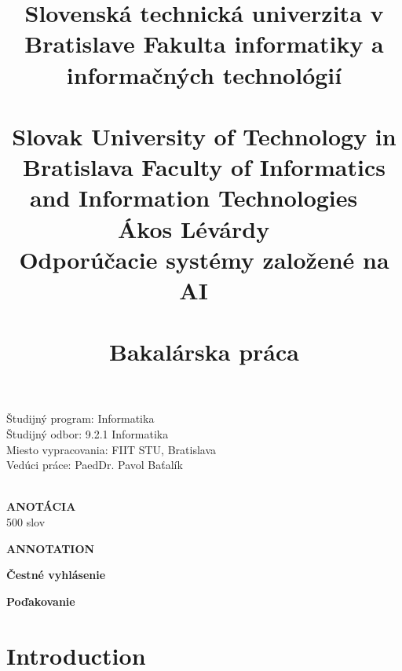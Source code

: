 \documentclass[10pt,oneside,english,a4paper]{article}
\title{\Large \textbf{
Slovenská technická univerzita v Bratislave
Fakulta informatiky a informačných technológií\\
\ \\
Slovak University of Technology in Bratislava
Faculty of Informatics and Information Technologies}
\ \\
\vspace{4\baselineskip}
\Large{ Ákos Lévárdy }
\ \\
\LARGE{ Odporúčacie systémy založené na AI }
\ \\
\ \\
\large{ Bakalárska práca }
}
\begin{document}
\maketitle


\vspace{7\baselineskip} %
\hspace{-2cm} %
\parbox{0.8\textwidth}{
\Large
Študijný program: Informatika\\
Študijný odbor: 9.2.1 Informatika\\
Miesto vypracovania: FIIT STU, Bratislava\\
Vedúci práce: PaedDr. Pavol Baťalík \\\\
}

\newpage{}
\hspace{-2cm}  
\Large \textbf{ANOTÁCIA}\\
500 slov

\newpage{}
\hspace{-2cm} 
\Large \textbf{ANNOTATION}


\newpage{}
\hspace{-2cm} 
\Large \textbf{Čestné vyhlásenie}


\newpage{}
\hspace{-2cm} 
\Large \textbf{Poďakovanie}

\newpage{}
\tableofcontents


\newpage{}
\section{Introduction}




















\clearpage


\nocite{*}
\end{document}
